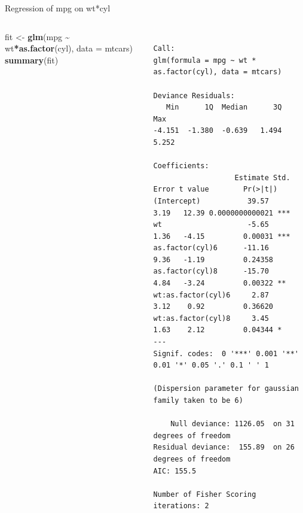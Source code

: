 \documentclass[australian,ignorenonframetext,aspectratio=169]{beamer}
\newenvironment{Shaded}{\begin{snugshade}}{\end{snugshade}}
\newcommand{\DataTypeTok}[1]{\textcolor[rgb]{0.13,0.29,0.53}{#1}}
\newcommand{\KeywordTok}[1]{\textcolor[rgb]{0.13,0.29,0.53}{\textbf{#1}}}
\newcommand{\NormalTok}[1]{#1}
\newcommand{\OperatorTok}[1]{\textcolor[rgb]{0.81,0.36,0.00}{\textbf{#1}}}
\newcommand{\StringTok}[1]{\textcolor[rgb]{0.31,0.60,0.02}{#1}}
\begin{document}
\begin{frame}[fragile]{Regression of mpg on wt*cyl}
\protect\hypertarget{regression-of-mpg-on-wtcyl}{}

\begin{columns}[T]
\begin{column}{0.5\textwidth}
\tiny

\begin{Shaded}
\begin{Highlighting}[]
\NormalTok{fit \textless{}{-}}\StringTok{ }\KeywordTok{glm}\NormalTok{(mpg }\OperatorTok{\textasciitilde{}}\StringTok{ }\NormalTok{wt}\OperatorTok{*}\KeywordTok{as.factor}\NormalTok{(cyl), }\DataTypeTok{data =}\NormalTok{ mtcars)}
\KeywordTok{summary}\NormalTok{(fit)}
\end{Highlighting}
\end{Shaded}
\end{column}

\begin{column}{0.5\textwidth}
\tiny

\begin{verbatim}

Call:
glm(formula = mpg ~ wt * as.factor(cyl), data = mtcars)

Deviance Residuals: 
   Min      1Q  Median      3Q     Max  
-4.151  -1.380  -0.639   1.494   5.252  

Coefficients:
                   Estimate Std. Error t value        Pr(>|t|)    
(Intercept)           39.57       3.19   12.39 0.0000000000021 ***
wt                    -5.65       1.36   -4.15         0.00031 ***
as.factor(cyl)6      -11.16       9.36   -1.19         0.24358    
as.factor(cyl)8      -15.70       4.84   -3.24         0.00322 ** 
wt:as.factor(cyl)6     2.87       3.12    0.92         0.36620    
wt:as.factor(cyl)8     3.45       1.63    2.12         0.04344 *  
---
Signif. codes:  0 '***' 0.001 '**' 0.01 '*' 0.05 '.' 0.1 ' ' 1

(Dispersion parameter for gaussian family taken to be 6)

    Null deviance: 1126.05  on 31  degrees of freedom
Residual deviance:  155.89  on 26  degrees of freedom
AIC: 155.5

Number of Fisher Scoring iterations: 2
\end{verbatim}
\end{column}
\end{columns}

\end{frame}
\end{document}

